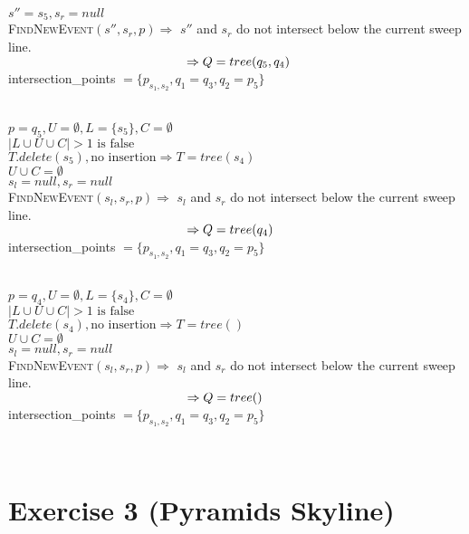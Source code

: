 \documentclass[english, fontsize=12pt, paper=a4, twoside=false, draft=true, pagesize=auto, version=last, DIV=16]{scrartcl}
\theoremstyle{break}
\begin{document}
$s''=s_5, s_r=null$ \\
{\scshape{FindNewEvent}}$(s'',s_r,p) \Rightarrow$ $s''$ and $s_r$ do not intersect below the current sweep line. \\
$\hspace*{49.5mm} \Rightarrow Q=tree(q_5,q_4)$ \\
intersection\_points $= \{p_{s_1,s_2},q_1=q_3,q_2=p_5\}$ \par
\vspace*{-3mm}
\hrulefill \\
\newpage
$p = q_5, U = \emptyset, L=\{s_5\}, C=\emptyset$ \\
$|L \cup U \cup C|>1 \text{ is false}$ \\
$T.delete(s_5), \text{no insertion} \Rightarrow T=tree(s_4)$ \\
$U \cup C=\emptyset$ \\
$s_l=null, s_r=null$ \\
{\scshape{FindNewEvent}}$(s_l,s_r,p) \Rightarrow$ $s_l$ and $s_r$ do not intersect below the current sweep line. \\
$\hspace*{49.5mm} \Rightarrow Q=tree(q_4)$ \\
intersection\_points $= \{p_{s_1,s_2},q_1=q_3,q_2=p_5\}$ \par
\vspace*{-3mm}
\hrulefill \\
$p = q_4, U = \emptyset, L=\{s_4\}, C=\emptyset$ \\
$|L \cup U \cup C|>1 \text{ is false}$ \\
$T.delete(s_4), \text{no insertion} \Rightarrow T=tree()$ \\
$U \cup C=\emptyset$ \\
$s_l=null, s_r=null$ \\
{\scshape{FindNewEvent}}$(s_l,s_r,p) \Rightarrow$ $s_l$ and $s_r$ do not intersect below the current sweep line. \\
$\hspace*{49.5mm} \Rightarrow Q=tree()$ \\
intersection\_points $= \{p_{s_1,s_2},q_1=q_3,q_2=p_5\}$ \par
\vspace*{-3mm}
\hrulefill \\
\newpage



\section*{Exercise 3 (Pyramids Skyline)}
\algrenewcommand{}
\algrenewcommand{}
\end{document}
